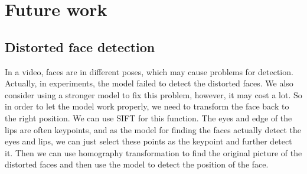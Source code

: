 \section{Future work}
\subsection{Distorted face detection}
In a video, faces are in different poses, which may cause problems for detection. Actually, in experiments, the model failed to detect the distorted faces. We also consider using a stronger model to fix this problem, however, it may cost a lot. 
So in order to let the model work properly, we need to transform the face back to the right position. We can use SIFT for this function. The eyes and edge of the lips are often keypoints, and as the model for finding the faces actually detect the eyes and lips, we can just select these points as the keypoint and further detect it. 
Then we can use homography transformation to find the original picture of the distorted faces and then use the model to detect the position of the face. 
	